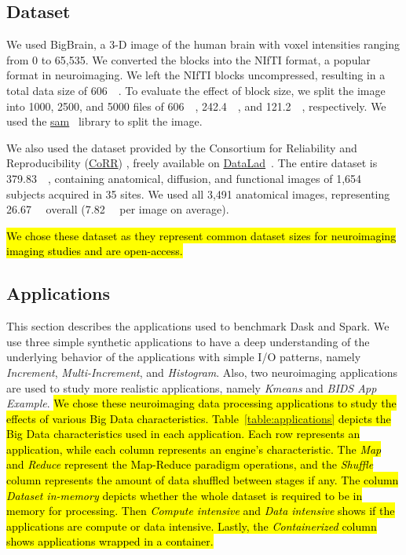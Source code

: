 \documentclass[AMA,STIX1COL]{WileyNJD-v2}
\newcommand{\HL}[1]{\hl{#1}}
\begin{document}
\subsection{Dataset}
We used BigBrain\cite{Amunts:13}, a 3-D image of the human brain with voxel
intensities ranging from 0 to 65,535. We converted the blocks into the
NIfTI format, a popular format in neuroimaging. We left the NIfTI blocks
uncompressed, resulting in a total data size of \SI{606}{\gibi\byte}. To
evaluate the effect of block size, we split the image into 1000, 2500,
and 5000 files of \SI{606}{\mebi\byte}, \SI{242.4}{\mebi\byte}, and
\SI{121.2}{\mebi\byte}, respectively.
We used the \href{https://github.com/big-data-lab-team/sam}{sam}~{\cite{sam}} library to split the image.
							
We also used the dataset provided by the Consortium for Reliability and
Reproducibility
(\href{http://fcon_1000.projects.nitrc.org/indi/CoRR/html/}{CoRR})
\cite{zuo2014open}, freely available on
\href{https://datasets.datalad.org/?dir=/corr/RawDataBIDS}{DataLad}~{\cite{DataladDataset}}.
The entire dataset is \SI{379.83}{\gibi\byte}, containing anatomical, diffusion,
and functional images of 1,654 subjects acquired in 35 sites.
We used all 3,491 anatomical images, representing \SI{26.67}{\gibi\byte} overall
(\SI{7.82}{\mebi\byte} per image on average).

\HL{
	We chose these dataset as they represent common dataset sizes for neuroimaging 
	imaging studies and are open-access.
}
							
\subsection{Applications}
This section describes the applications used to benchmark Dask and Spark.
We use three simple synthetic applications to have a deep understanding of the 
underlying behavior of the applications with simple I/O patterns, namely
\textit{Increment}, \textit{Multi-Increment}, and \textit{Histogram}.
Also, two neuroimaging applications are used to study more realistic 
applications, namely \textit{Kmeans} and \textit{BIDS App Example}{\cite{gorgolewski2017bids}}.
\HL{
	We chose these neuroimaging data processing applications to study the 
	effects of various Big Data characteristics.
	Table~{\ref{table:applications}} depicts the Big Data characteristics used in
	each application. 
	Each row represents an application, while each column represents an engine's characteristic.
	The \textit{Map} and \textit{Reduce} represent the Map-Reduce paradigm operations,
	and the \textit{Shuffle} column represents the amount of data shuffled between stages if any.
	The column \textit{Dataset in-memory} depicts whether the whole dataset is required to 
	be in memory for processing.
	Then \textit{Compute intensive} and \textit{Data intensive} shows if the applications are
	compute or data intensive.
	Lastly, the \textit{Containerized} column shows applications wrapped in a container.
}
\end{document}
